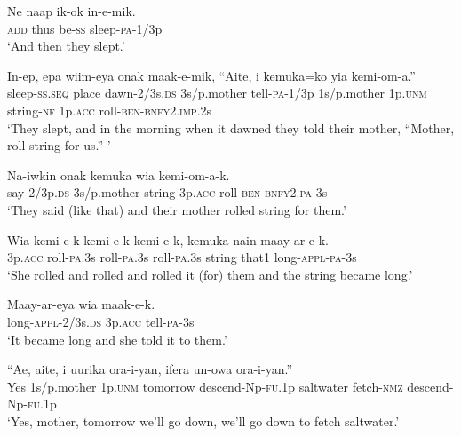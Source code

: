 \ea\label{ex:a:x13}
\gll  Ne  naap  ik-ok  in-e-mik. \\
\textsc{add}  thus  be-\textsc{ss}  sleep-\textsc{pa}-1/3p \\
\glt ‘And then they slept.’ \\
\z


\ea\label{ex:a:x14}
\gll  In-ep,  epa  wiim-eya  onak  maak-e-mik,  “Aite,                     i  kemuka=ko  yia  kemi-om-a.” \\
sleep-\textsc{ss.seq}  place  dawn-2/3s.\textsc{ds}  3s/p.mother  tell-\textsc{pa}-1/3p  1s/p.mother  1p.\textsc{unm}  string-\textsc{nf}  1p.\textsc{acc}  roll-\textsc{ben}-\textsc{bnfy}2.\textsc{imp}.2s \\


\glt ‘They slept, and in the morning when it dawned they told their mother, “Mother, roll string for us.” ’ \\
\z


\ea\label{ex:a:x15}
\gll  Na-iwkin  onak  kemuka  wia  kemi-om-a-k. \\
say-2/3p.\textsc{ds}  3s/p.mother  string  3p.\textsc{acc}  roll-\textsc{ben}-\textsc{bnfy}2.\textsc{pa}-3s \\
\glt ‘They said (like that) and their mother rolled string for them.’ \\
\z


\ea\label{ex:a:x16}
\gll  Wia  kemi-e-k  kemi-e-k  kemi-e-k,  kemuka  nain  maay-ar-e-k. \\
3p.\textsc{acc}  roll-\textsc{pa}.3s  roll-\textsc{pa}.3s  roll-\textsc{pa}.3s  string  that1  long-\textsc{appl}-\textsc{pa}-3s \\
\glt ‘She rolled and rolled and rolled it (for) them and the string became long.’ \\
\z


\ea\label{ex:a:x17}
\gll  Maay-ar-eya  wia  maak-e-k. \\
long-\textsc{appl}-2/3s.\textsc{ds}  3p.\textsc{acc}  tell-\textsc{pa}-3s \\
\glt ‘It became long and she told it to them.’ \\
\z


\ea\label{ex:a:x18}
\gll  “Ae,  aite,  i  uurika  ora-i-yan,  ifera                  un-owa  ora-i-yan.” \\
Yes  1s/p.mother  1p.\textsc{unm}  tomorrow  descend-Np-\textsc{fu}.1p  saltwater  fetch-\textsc{nmz}  descend-Np-\textsc{fu}.1p \\


\glt ‘Yes, mother, tomorrow we’ll go down, we’ll go down to fetch saltwater.’ \\
\z



